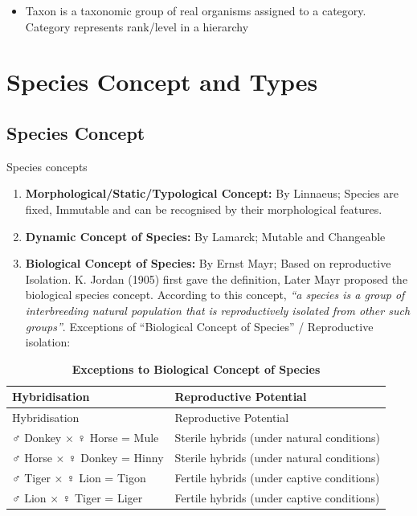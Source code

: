 \documentclass[
]{book}
\providecommand{\tightlist}{%
  \setlength{\itemsep}{0pt}\setlength{\parskip}{0pt}}
\begin{document}
\begin{itemize}
\tightlist
\item
  Taxon is a taxonomic group of real organisms assigned to a category. Category represents rank/level in a hierarchy
\end{itemize}

\hypertarget{species-concept-and-types}{%
\section{Species Concept and Types}\label{species-concept-and-types}}

\hypertarget{species-concept}{%
\subsection{Species Concept}\label{species-concept}}

Species concepts \citep{dequeiroz2007}

\begin{enumerate}
\def\labelenumi{\arabic{enumi}.}
\item
  \textbf{Morphological/Static/Typological Concept:} By Linnaeus; Species are fixed, Immutable and can be recognised by their morphological features.
\item
  \textbf{Dynamic Concept of Species:} By Lamarck; Mutable and Changeable
\item
  \textbf{Biological Concept of Species:} By Ernst Mayr; Based on reproductive Isolation. K. Jordan (1905) first gave the definition, Later Mayr proposed the biological species concept. According to this concept, \emph{``a species is a group of interbreeding natural population that is reproductively isolated from other such groups''}. Exceptions of ``Biological Concept of Species'' / Reproductive isolation:
\end{enumerate}

\begin{longtable}[]{@{}ll@{}}
\caption{\textbf{\label{tab:hybridisation-type} Exceptions to Biological Concept of Species}}\tabularnewline
\toprule
Hybridisation & Reproductive Potential \\
\midrule
\endfirsthead
\toprule
Hybridisation & Reproductive Potential \\
\midrule
\endhead
♂ Donkey × ♀ Horse = Mule & Sterile hybrids (under natural conditions) \\
♂ Horse × ♀ Donkey = Hinny & Sterile hybrids (under natural conditions) \\
♂ Tiger × ♀ Lion = Tigon & Fertile hybrids (under captive conditions) \\
♂ Lion × ♀ Tiger = Liger & Fertile hybrids (under captive conditions) \\
\bottomrule
\end{longtable}
\end{document}
